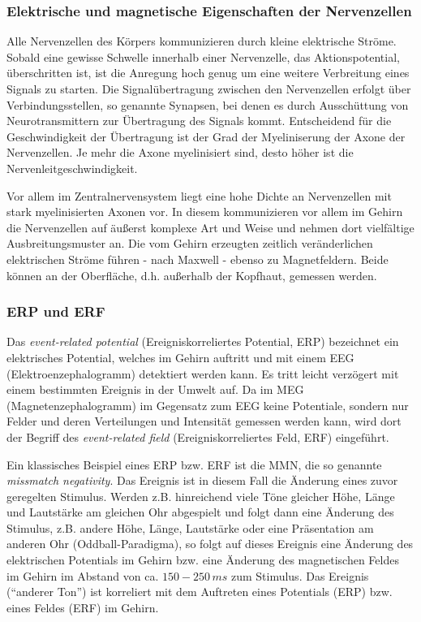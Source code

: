 \documentclass[doc,a4paper,12pt]{apa6}
\begin{document}
\subsubsection{Elektrische und magnetische Eigenschaften der Nervenzellen}

Alle Nervenzellen des Körpers kommunizieren durch kleine elektrische Ströme. Sobald eine gewisse Schwelle innerhalb einer Nervenzelle, das Aktionspotential, überschritten ist, ist die Anregung hoch genug um eine weitere Verbreitung eines Signals zu starten. Die Signalübertragung zwischen den Nervenzellen erfolgt über Verbindungsstellen, so genannte Synapsen, bei denen es durch Ausschüttung von Neurotransmittern zur Übertragung des Signals kommt. Entscheidend für die Geschwindigkeit der Übertragung ist der Grad der Myeliniserung der Axone der Nervenzellen. Je mehr die Axone myelinisiert sind, desto höher ist die Nervenleitgeschwindigkeit.

Vor allem im Zentralnervensystem liegt eine hohe Dichte an Nervenzellen mit stark myelinisierten Axonen vor. In diesem kommunizieren vor allem im Gehirn die Nervenzellen auf äußerst komplexe Art und Weise und nehmen dort vielfältige Ausbreitungsmuster an. Die vom Gehirn erzeugten zeitlich veränderlichen elektrischen Ströme führen - nach Maxwell - ebenso zu Magnetfeldern. Beide können an der Oberfläche, d.h. außerhalb der Kopfhaut, gemessen werden.

\subsubsection{ERP und ERF}
\label{sec:erf}

Das \emph{event-related potential} (Ereigniskorreliertes Potential, ERP) bezeichnet ein elektrisches Potential, welches im Gehirn auftritt und mit einem EEG (Elektroenzephalogramm) detektiert werden kann. Es tritt leicht verzögert mit einem bestimmten Ereignis in der Umwelt auf. Da im MEG (Magnetenzephalogramm) im Gegensatz zum EEG keine Potentiale, sondern nur Felder und deren Verteilungen und Intensität gemessen werden kann, wird dort der Begriff des \emph{event-related field} (Ereigniskorreliertes Feld, ERF) eingeführt.

Ein klassisches Beispiel eines ERP bzw. ERF ist die MMN, die so genannte \emph{missmatch negativity}. Das Ereignis ist in diesem Fall die Änderung eines zuvor geregelten Stimulus. Werden z.B. hinreichend viele Töne gleicher Höhe, Länge und Lautstärke am gleichen Ohr abgespielt und folgt dann eine Änderung des Stimulus, z.B. andere Höhe, Länge, Lautstärke oder eine Präsentation am anderen Ohr (Oddball-Paradigma), so folgt auf dieses Ereignis eine Änderung des elektrischen Potentials im Gehirn bzw. eine Änderung des magnetischen Feldes im Gehirn im Abstand von ca. $150-250\,ms$ zum Stimulus. Das Ereignis (``anderer Ton'') ist korreliert mit dem Auftreten eines Potentials (ERP) bzw. eines Feldes (ERF) im Gehirn.
\end{document}

